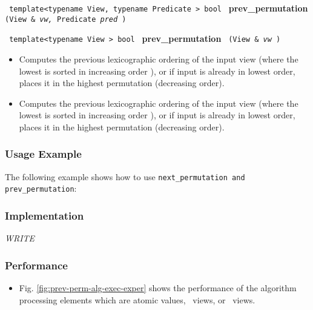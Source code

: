 \noindent
\texttt{%
template<typename View, typename Predicate >
\newline
bool 
}
\newline
\textbf{prev\_permutation}%
\texttt{%
(View \&
\textit{vw,}%
Predicate 
\textit{pred}%
)
}
\vspace{0.4cm}

\noindent
\texttt{%
template<typename View >
\newline
bool 
}
\newline
\textbf{prev\_permutation}%
\texttt{%
(View \&
\textit{vw}%
)
}

\begin{itemize}
\item
Computes the previous lexicographic ordering of the input view (where the lowest is sorted in increasing order
), or if input is already in lowest order, places it in the highest permutation (decreasing order). 
\item
Computes the previous lexicographic ordering of the input view (where the lowest is sorted in increasing order
), or if input is already in lowest order, places it in the highest permutation (decreasing order). 
\end{itemize}

\subsubsection{Usage Example} %

The following example shows how to use \texttt{next\_permutation and prev\_permutation}:
 
\subsubsection{Implementation} %

\textit{WRITE}

\subsubsection{Performance} %

\begin{itemize}
\item
Fig. \ref{fig:prev-perm-alg-exec-exper}
shows the performance of the algorithm processing
elements which are atomic values, \stl\ views, or \stapl\ views.
\end{itemize}

